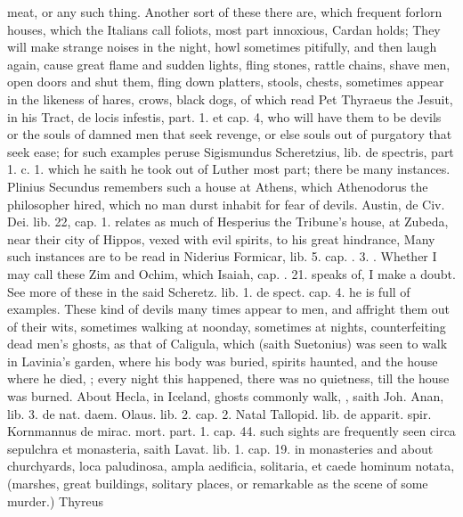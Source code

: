 {{meat, or any such thing. Another sort of these there are, which
frequent forlorn houses, which the Italians call foliots, most
part innoxious, Cardan holds; They will make strange noises in
the night, howl sometimes pitifully, and then laugh again, cause great
flame and sudden lights, fling stones, rattle chains, shave men, open
doors and shut them, fling down platters, stools, chests, sometimes
appear in the likeness of hares, crows, black dogs, \etc{} of which read
Pet Thyraeus the Jesuit, in his \textlatin{Tract, de locis infestis, part.
1. et cap. 4}, who will have them to be devils or the souls of damned
men that seek revenge, or else souls out of purgatory that seek ease;
for such examples peruse Sigismundus Scheretzius, \textlatin{lib. de
spectris, part 1. c. 1.} which he saith he took out of Luther most part;
there be many instances. Plinius Secundus remembers such a house
at Athens, which Athenodorus the philosopher hired, which no man durst
inhabit for fear of devils. Austin, \textlatin{de Civ. Dei. lib. 22, cap. 1.}
relates as much of Hesperius the Tribune's house, at Zubeda, near their
city of Hippos, vexed with evil spirits, to his great hindrance,  Many such instances are to be
read in Niderius Formicar, lib. 5. cap. . 3. \etc{}. Whether I may call
these Zim and Ochim, which Isaiah, cap. . 21. speaks of, I make a
doubt. See more of these in the said Scheretz. lib. 1. de spect. cap.
4. he is full of examples. These kind of devils many times appear to
men, and affright them out of their wits, sometimes walking at
noonday, sometimes at nights, counterfeiting dead men's ghosts,
as that of Caligula, which (saith Suetonius) was seen to walk in
Lavinia's garden, where his body was buried, spirits haunted, and the
house where he died, ; every night this happened, there was no quietness,
till the house was burned. About Hecla, in Iceland, ghosts commonly
walk, , saith Joh. Anan, lib. 3. de nat.
daem. Olaus. lib. 2. cap. 2. Natal Tallopid. lib. de apparit. spir.
Kornmannus de mirac. mort. part. 1. cap. 44. such sights are frequently
seen circa sepulchra et monasteria, saith Lavat. lib. 1. cap. 19. in
monasteries and about churchyards, loca paludinosa, ampla aedificia,
solitaria, et caede hominum notata, \etc{} (marshes, great buildings,
solitary places, or remarkable as the scene of some murder.) Thyreus
}}
